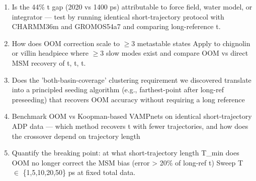 \documentclass[11pt]{article}
\begin{document}
\begin{enumerate}[leftmargin=1.6em,itemsep=0.2em,topsep=0.2em,label=Q\arabic*.]
\item Is the 44\% t gap (2020 vs 1400 ps) attributable to force field, water model, or integrator --- test by running identical short-trajectory protocol with CHARMM36m and GROMOS54a7 and comparing long-reference t.
\item How does OOM correction scale to $\geq$3 metastable states Apply to chignolin or villin headpiece where $\geq$3 slow modes exist and compare OOM vs direct MSM recovery of t, t, t.
\item Does the 'both-basin-coverage' clustering requirement we discovered translate into a principled seeding algorithm (e.g., farthest-point after long-ref preseeding) that recovers OOM accuracy without requiring a long reference
\item Benchmark OOM vs Koopman-based VAMPnets on identical short-trajectory ADP data --- which method recovers t with fewer trajectories, and how does the crossover depend on trajectory length
\item Quantify the breaking point: at what short-trajectory length T\_min does OOM no longer correct the MSM bias (error \textgreater{} 20\% of long-ref t) Sweep T $\in$ \{1,5,10,20,50\} ps at fixed total data.
\end{enumerate}
\end{document}
